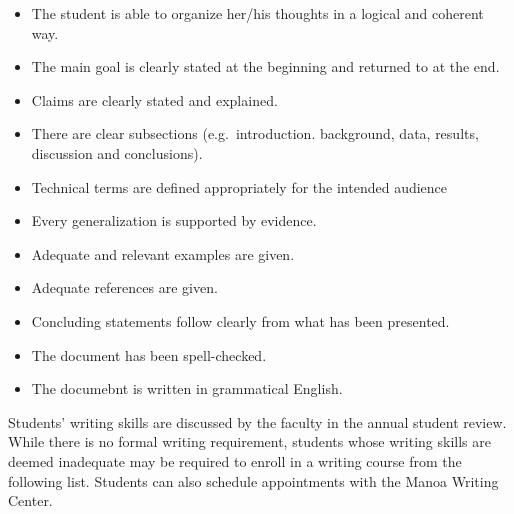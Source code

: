 \documentclass[
]{book}
\providecommand{\tightlist}{%
  \setlength{\itemsep}{0pt}\setlength{\parskip}{0pt}}
\begin{document}
\begin{itemize}
\tightlist
\item
  The student is able to organize her/his thoughts in a logical and coherent way.
\item
  The main goal is clearly stated at the beginning and returned to at the end.
\item
  Claims are clearly stated and explained.
\item
  There are clear subsections (e.g.~introduction. background, data, results, discussion and conclusions).
\item
  Technical terms are defined appropriately for the intended audience
\item
  Every generalization is supported by evidence.
\item
  Adequate and relevant examples are given.
\item
  Adequate references are given.
\item
  Concluding statements follow clearly from what has been presented.
\item
  The document has been spell-checked.
\item
  The documebnt is written in grammatical English.
\end{itemize}

Students' writing skills are discussed by the faculty in the annual student review. While there is no formal writing requirement, students whose writing skills are deemed inadequate may be required to enroll in a writing course from the following list. Students can also schedule appointments with the Manoa Writing Center.
\end{document}
